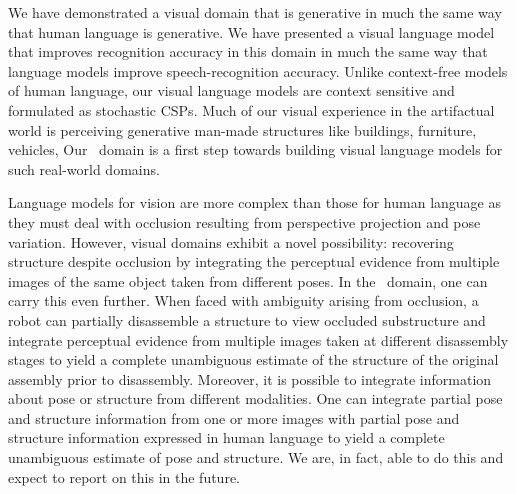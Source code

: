 We have demonstrated a visual domain that is generative in much the same way
that human language is generative.
%
We have presented a visual language model that improves recognition accuracy in
this domain in much the same way that language models improve
speech-recognition accuracy.
%
Unlike context-free models of human language, our visual language models are
context sensitive and formulated as stochastic CSPs.
%
Much of our visual experience in the artifactual world is perceiving generative
man-made structures like buildings, furniture, vehicles, \etc{}
%
Our \LincolnLog\ domain is a first step towards building visual language models
for such real-world domains.

Language models for vision are more complex than those for human language as
they must deal with occlusion resulting from perspective projection and pose
variation.
%
However, visual domains exhibit a novel possibility: recovering structure
despite occlusion by integrating the perceptual evidence from multiple images
of the same object taken from different poses.
%
In the \LincolnLog\ domain, one can carry this even further.
%
When faced with ambiguity arising from occlusion, a robot can partially
disassemble a structure to view occluded substructure and integrate perceptual
evidence from multiple images taken at different disassembly stages to yield a
complete unambiguous estimate of the structure of the original assembly prior
to disassembly.
%
Moreover, it is possible to integrate information about pose or structure from
different modalities.
%
One can integrate partial pose and structure information from one or more
images with partial pose and structure information expressed in human language
to yield a complete unambiguous estimate of pose and structure.
%
We are, in fact, able to do this and expect to report on this in the future.
